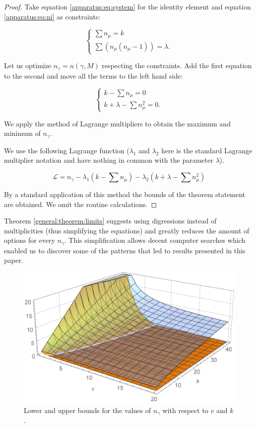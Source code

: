 \begin{proof}
	Take equation \eqref{apparatus:eq:system} for the identity element and equation \eqref{apparatus:eq:ni} as constraints:
	
	\begin{equation}
		\begin{cases}
			\sum {n_\mu} = k \\
			\sum (n_\mu(n_\mu-1)) = \lambda.
		\end{cases}
	\end{equation}
	
	Let us optimize $n_\gamma=n(\gamma,M)$ respecting the constraints. Add the first equation to the second and move all the terms to the left hand side:
	
	\begin{equation}
		\begin{cases}
			k - \sum {n_\mu} = 0 \\
			k + \lambda - \sum n_\mu^2 = 0.
		\end{cases}
	\end{equation}
	
	We apply the method of Lagrange multipliers to obtain the maximum and minimum of $n_\gamma$. 
	
	We use the following Lagrange function ($\lambda_1$ and $\lambda_2$ here is the standard Lagrange multiplier notation and have nothing in common with the parameter $\lambda$).
	
	\begin{equation}
		\mathcal L = n_\gamma - \lambda_1 (k - \sum n_\mu) - \lambda_2 (k + \lambda - \sum n_\mu^2)
	\end{equation}
	
	By a standard application of this method the bounds of the theorem statement are obtained. We omit the routine calculations.
\end{proof}

Theorem \ref{general:theorem:limits} suggests using digressions instead of multiplicities (thus simplifying the equations) and greatly reduces the amount of options for every $n_\gamma$. This simplification allows decent computer searches which enabled us to discover some of the patterns that led to results presented in this paper.
	
\begin{figure}
	\includegraphics[width=\textwidth]{assets/boundingSurfaces}
	\caption{Lower and upper bounds for the values of $n_\gamma$ with respect to $v$ and $k$.}
	\label{general:figure:limits}
\end{figure}

